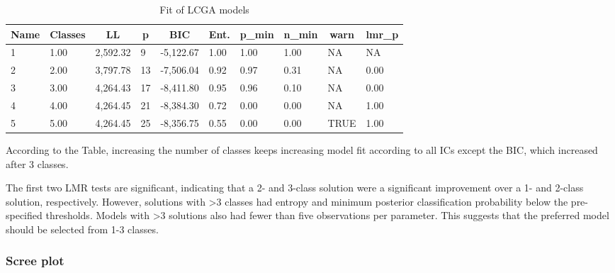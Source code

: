 \documentclass[
  man,floatsintext]{apa6}
\begin{document}
\begin{table}[tbp]

\begin{center}
\begin{threeparttable}

\caption{\label{tab:tabfit}Fit of LCGA models}

\begin{tabular}{llllllllll}
\toprule
Name & \multicolumn{1}{c}{Classes} & \multicolumn{1}{c}{LL} & \multicolumn{1}{c}{p} & \multicolumn{1}{c}{BIC} & \multicolumn{1}{c}{Ent.} & \multicolumn{1}{c}{p\_min} & \multicolumn{1}{c}{n\_min} & \multicolumn{1}{c}{warn} & \multicolumn{1}{c}{lmr\_p}\\
\midrule
1 & 1.00 & 2,592.32 & 9 & -5,122.67 & 1.00 & 1.00 & 1.00 & NA & NA\\
2 & 2.00 & 3,797.78 & 13 & -7,506.04 & 0.92 & 0.97 & 0.31 & NA & 0.00\\
3 & 3.00 & 4,264.43 & 17 & -8,411.80 & 0.95 & 0.96 & 0.10 & NA & 0.00\\
4 & 4.00 & 4,264.45 & 21 & -8,384.30 & 0.72 & 0.00 & 0.00 & NA & 1.00\\
5 & 5.00 & 4,264.45 & 25 & -8,356.75 & 0.55 & 0.00 & 0.00 & TRUE & 1.00\\
\bottomrule
\end{tabular}

\end{threeparttable}
\end{center}

\end{table}

According to the Table, increasing the number of classes keeps increasing model fit according to all ICs except the BIC, which increased after 3 classes.

The first two LMR tests are significant,
indicating that a 2- and 3-class solution were a significant improvement over a 1- and 2-class solution, respectively.
However, solutions with \textgreater3 classes had entropy and minimum posterior classification probability below the pre-specified thresholds.
Models with \textgreater3 solutions also had fewer than five observations per parameter.
This suggests that the preferred model should be selected from 1-3 classes.

\hypertarget{scree-plot}{%
\subsubsection{Scree plot}\label{scree-plot}}
\end{document}

